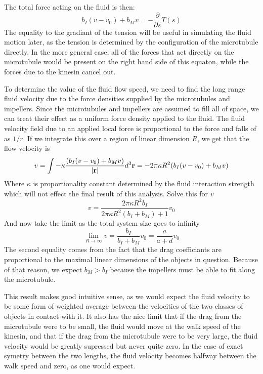 \documentclass[11pt]{ucthesis}
\def\br{{\bf r}}
\begin{document}
The total force acting on the fluid is then:
\begin{equation}
\label{eq:mfnetFforce}
b_I (v - v_0) + b_M v = -\frac{\partial}{\partial s}T(s)
\end{equation}
The equality to the gradiant of the tension will be useful in simulating the fluid motion later, as the tension is determined by the configuration of the microtubule directly. 
In the more general case, all of the forces that act directly on the microtubule would be present on the right hand side of this equaton, while the forces due to the kinesin cancel out.

To determine the value of the fluid flow speed, we need to find the long range fluid velocity due to the force densities supplied by the microtubules and impellers.
Since the microtubules and impellers are assumed to fill all of space, we can treat their effect as a uniform force density applied to the fluid.
The fluid velocity field due to an applied local force is proportional to the force and falls of as $1/r$. If we integrate this over a region of linear dimension $R$, we get that the flow velocity is
\begin{equation}
\label{eq:mfflow}
v = \int -\kappa \frac{(b_I (v - v_0) + b_M v)}{|\br|} d^3\br = -2\pi \kappa R^2 (b_I (v - v_0) + b_M v)
\end{equation}
Where $\kappa$ is proportionality constant determined by the fluid interaction strength which will not effect the final result of this analysis.
Solve this for $v$
\begin{equation}
\label{eq:mfflowsol}
v = \frac{2\pi \kappa R^2 b_I}{2\pi \kappa R^2(b_I + b_M) + 1} v_0
\end{equation}
And now take the limit as the total system size goes to infinity
\begin{equation}
\label{eq:mfflowlimit}
\lim_{R\to\infty} v = \frac{b_I}{b_I + b_M} v_0 = \frac{a}{a+d} v_0
\end{equation}
The second equality comes from the fact that the drag coefficiants are proportional to the maximal linear dimensions of the objects in question. Because of that reason, we expect $b_M > b_I$ because the impellers must be able to fit along the microtubule.

This result makes good intuitive sense, as we would expect the fluid velocity to be some form of weighted average between the velocities of the two classes of objects in contact with it. 
It also has the nice limit that if the drag from the microtubule were to be small, the fluid would move at the walk speed of the kinesin, and that if the drag from the microtubule were to be very large, the fluid velocity would be greatly supressed but never quite zero.
In the case of exact symetry between the two lengths, the fluid velocity becomes halfway between the walk speed and zero, as one would expect.
\end{document}
